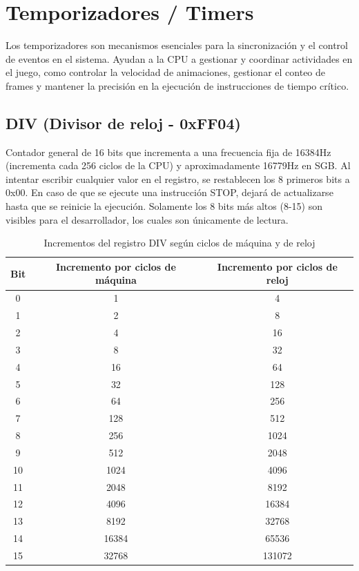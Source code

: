 \section{Temporizadores / Timers}
\label{history_timer}
Los temporizadores son mecanismos esenciales para la sincronización y el control de eventos en el sistema. Ayudan a la CPU a gestionar y coordinar actividades en el juego, como controlar la velocidad de animaciones, gestionar el conteo de frames y mantener la precisión en la ejecución de instrucciones de tiempo crítico.

\subsection{DIV (Divisor de reloj - 0xFF04)}
Contador general de 16 bits que incrementa a una frecuencia fija de 16384Hz (incrementa cada 256 ciclos de la CPU) y aproximadamente 16779Hz en SGB. Al intentar escribir cualquier valor en el registro, se restablecen los 8 primeros bits a 0x00. En caso de que se ejecute una instrucción STOP, dejará de actualizarse hasta que se reinicie la ejecución. Solamente los 8 bits más altos (8-15) son visibles para el desarrollador, los cuales son únicamente de lectura.
\begin{table}[H]
    \centering
    \begin{tabular}{|c|c|c|}
    \hline
    \textbf{Bit} & \textbf{Incremento por ciclos de máquina} & \textbf{Incremento por ciclos de reloj} \\ \hline
    0  & 1 & 4 \\ \hline
    1  & 2 & 8 \\ \hline
    2  & 4 & 16 \\ \hline
    3  & 8  & 32 \\ \hline
    4  & 16 & 64 \\ \hline
    5  & 32 & 128 \\ \hline
    6  & 64 & 256 \\ \hline
    7  & 128 & 512 \\ \hline
    8  & 256 & 1024 \\ \hline
    9  & 512 & 2048 \\ \hline
    10 & 1024 & 4096 \\ \hline
    11 & 2048 & 8192 \\ \hline
    12 & 4096 & 16384 \\ \hline
    13 & 8192 & 32768 \\ \hline
    14 & 16384 & 65536 \\ \hline
    15 & 32768 & 131072 \\ \hline
    \end{tabular}
    \caption{Incrementos del registro DIV según ciclos de máquina y de reloj}
\end{table}

